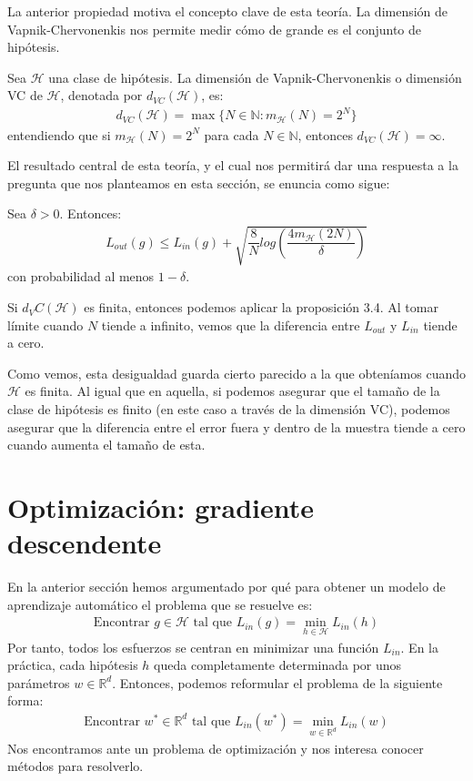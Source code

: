 La anterior propiedad motiva el concepto clave de esta teoría. La dimensión de Vapnik-Chervonenkis nos permite medir cómo de grande es el conjunto de hipótesis.

\begin{definition}
	Sea $\mathcal{H}$ una clase de hipótesis. La dimensión de Vapnik-Chervonenkis o dimensión VC de $\mathcal{H}$, denotada por $d_{VC}(\mathcal{H})$, es:
	\begin{align*}
		d_{VC}(\mathcal{H}) = \max \{ N \in \mathbb{N} \colon m_{\mathcal{H}}(N) = 2^N \}
	\end{align*}
	entendiendo que si $m_{\mathcal{H}}(N) = 2^N$ para cada $N \in \mathbb{N}$, entonces $d_{VC}(\mathcal{H}) = \infty$. 
\end{definition}

El resultado central de esta teoría, y el cual nos permitirá dar una respuesta a la pregunta que nos planteamos en esta sección, se enuncia como sigue:

\begin{theorem}[Cota VC]
	Sea $\delta >0$. Entonces:
	\begin{align*}
		L_{out}(g) \leq L_{in}(g) + \sqrt{ \dfrac{8}{N} log \left( \dfrac{4 m_{\mathcal{H}}(2N) }{\delta} \right) }
	\end{align*}
	con probabilidad al menos $1-\delta$.
\end{theorem}

Si $d_VC(\mathcal{H})$ es finita, entonces podemos aplicar la proposición 3.4. Al tomar límite cuando $N$ tiende a infinito, vemos que la diferencia entre $L_{out}$ y $L_{in}$ tiende a cero.

Como vemos, esta desigualdad guarda cierto parecido a la que obteníamos cuando $\mathcal{H}$ es finita. Al igual que en aquella, si podemos asegurar que el tamaño de la clase de hipótesis es finito (en este caso a través de la dimensión VC), podemos asegurar que la diferencia entre el error fuera y dentro de la muestra tiende a cero cuando aumenta el tamaño de esta.

\section{Optimización: gradiente descendente}
En la anterior sección hemos argumentado por qué para obtener un modelo de aprendizaje automático el problema que se resuelve es:
\begin{gather*}
	\text{Encontrar $g \in \mathcal{H}$ tal que } L_{in}(g) = \min_{h \in \mathcal{H}} L_{in}(h)
\end{gather*}
Por tanto, todos los esfuerzos se centran en minimizar una función $L_{in}$. En la práctica, cada hipótesis $h$ queda completamente determinada por unos parámetros $w \in \mathbb{R}^d$. Entonces, podemos reformular el problema de la siguiente forma:
\begin{gather*}
	\text{Encontrar $w^* \in \mathbb{R}^d$ tal que } L_{in}(w^*) = \min_{w \in \mathbb{R}^d} L_{in}(w)
\end{gather*}
Nos encontramos ante un problema de optimización y nos interesa conocer métodos para resolverlo.

